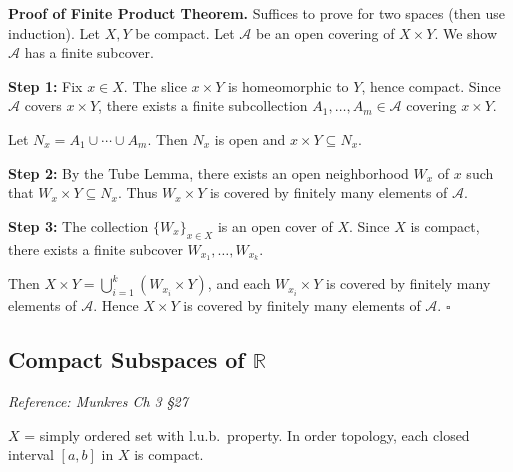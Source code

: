\documentclass[11pt]{report}
\renewenvironment{proof}[1][Proof]{\noindent\textbf{#1.} }{\hfill$\square$\par\vspace{5pt}}
\begin{document}
\begin{proof}[Proof of Finite Product Theorem]
Suffices to prove for two spaces (then use induction). Let $X, Y$ be compact. Let $\mathcal{A}$ be an open covering of $X \times Y$. We show $\mathcal{A}$ has a finite subcover.

\textbf{Step 1:} Fix $x \in X$. The slice $x \times Y$ is homeomorphic to $Y$, hence compact. Since $\mathcal{A}$ covers $x \times Y$, there exists a finite subcollection $A_1, \ldots, A_m \in \mathcal{A}$ covering $x \times Y$.

Let $N_x = A_1 \cup \cdots \cup A_m$. Then $N_x$ is open and $x \times Y \subseteq N_x$.

\textbf{Step 2:} By the Tube Lemma, there exists an open neighborhood $W_x$ of $x$ such that $W_x \times Y \subseteq N_x$. Thus $W_x \times Y$ is covered by finitely many elements of $\mathcal{A}$.

\textbf{Step 3:} The collection $\{W_x\}_{x \in X}$ is an open cover of $X$. Since $X$ is compact, there exists a finite subcover $W_{x_1}, \ldots, W_{x_k}$.

Then $X \times Y = \bigcup_{i=1}^{k} (W_{x_i} \times Y)$, and each $W_{x_i} \times Y$ is covered by finitely many elements of $\mathcal{A}$. Hence $X \times Y$ is covered by finitely many elements of $\mathcal{A}$.
\end{proof}

\subsection{Compact Subspaces of $\mathbb{R}$}

\textit{Reference: Munkres Ch 3 \S 27}

\begin{thmbox}
$X$ = simply ordered set with l.u.b.\ property. In order topology, each closed interval $[a, b]$ in $X$ is compact.
\end{thmbox}
\end{document}
